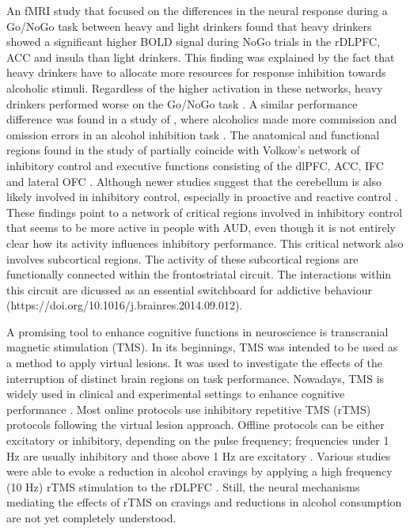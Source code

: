 \documentclass[12pt]{article}
\begin{document}
An fMRI study that focused on the differences in the neural response during a Go/NoGo task between heavy and light drinkers found that heavy drinkers showed a significant higher BOLD signal during NoGo trials in the rDLPFC, ACC and insula than light drinkers. This finding was explained by the fact that heavy drinkers have to allocate more resources for response inhibition towards alcoholic stimuli. Regardless of the higher activation in these networks, heavy drinkers performed worse on the Go/NoGo task \parencite{amesNeuralCorrelatesGo2014}. A similar performance difference was found in a study of \textcite{noelAlcoholCuesIncrease2007}, where alcoholics made more commission and omission errors in an alcohol inhibition task \parencite{noelAlcoholCuesIncrease2007}. The anatomical and functional regions found in the study of \textcite{amesNeuralCorrelatesGo2014} partially coincide with Volkow's network of inhibitory control and executive functions consisting of the dlPFC, ACC, IFC and lateral OFC \parencite{volkowAddictionScienceUncovering2014}. Although newer studies suggest that the cerebellum is also likely involved in inhibitory control, especially in proactive and reactive control \parencite{clarkCerebellarContributionsProactive2020}. These findings point to a network of critical regions involved in inhibitory control that seems to be more active in people with AUD, even though it is not entirely clear how its activity influences inhibitory performance. This critical network also involves subcortical regions. The activity of these subcortical regions are functionally connected within the frontostriatal circuit. The interactions within this circuit are dicussed as an essential switchboard for addictive behaviour (https://doi.org/10.1016/j.brainres.2014.09.012). 

A promising tool to enhance cognitive functions in neuroscience is transcranial magnetic stimulation (TMS). In its beginnings, TMS was intended to be used as a method to apply virtual lesions. It was used to investigate the effects of the interruption of distinct brain regions on task performance. Nowadays, TMS is widely used in clinical and experimental settings to enhance cognitive performance \parencite{luberEnhancementHumanCognitive2014}. Most online protocols use inhibitory repetitive TMS (rTMS) protocols following the virtual lesion approach. Offline protocols can be either excitatory or inhibitory, depending on the pulse frequency; frequencies under 1 Hz are usually inhibitory and those above 1 Hz are excitatory \parencite{beynelEffectsOnlineRepetitive2019}. Various studies were able to evoke a reduction in alcohol cravings by applying a high frequency (10 Hz) rTMS stimulation to the rDLPFC \parencite{antonelliTranscranialMagneticStimulation2021}. Still, the neural mechanisms mediating the effects of rTMS on cravings and reductions in alcohol consumption are not yet completely understood. 
\end{document}
